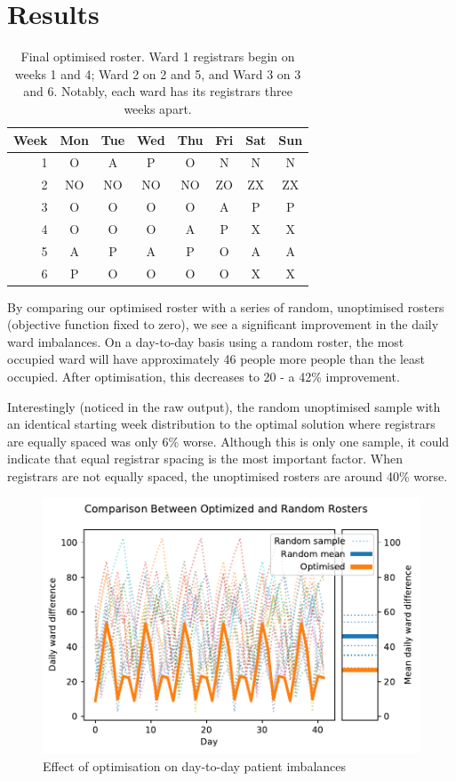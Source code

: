 \documentclass[a4paper]{article}
\begin{document}
\section{Results}
\begin{table}[H]
\centering
\caption{Final optimised roster. Ward 1 registrars begin on weeks 1 and 4; Ward 2 on 2 and 5, and Ward 3 on 3 and 6. Notably, each ward has its registrars three weeks apart.}
\label{tab:roster}
\begin{tabular}{r|ccccccc}
Week & Mon & Tue & Wed & Thu & Fri & Sat & Sun \\
\hline
 1	&O	&A	&P	&O	&N	&N	&N	\\
 2	&NO	&NO	&NO	&NO	&ZO	&ZX	&ZX	\\
 3	&O	&O	&O	&O	&A	&P	&P	\\
 4	&O	&O	&O	&A	&P	&X	&X	\\
 5	&A	&P	&A	&P	&O	&A	&A	\\
 6	&P	&O	&O	&O	&O	&X	&X	\\
\end{tabular}
\end{table}
\begin{multicols}{2}

By comparing our optimised roster with a series of random, unoptimised rosters (objective function fixed to zero), we see a significant improvement in the daily ward imbalances. On a day-to-day basis using a random roster, the most occupied ward will have approximately 46 people more people than the least occupied. After optimisation, this decreases to 20 - a 42\% improvement.

Interestingly (noticed in the raw output), the random unoptimised sample with an identical starting week distribution to the optimal solution where registrars are equally spaced was only 6\% worse. Although this is only one sample, it could indicate that equal registrar spacing is the most important factor. When registrars are not equally spaced, the unoptimised rosters are around 40\% worse.

\begin{figure}[H]
    \centering\includegraphics[width=\linewidth]{../results/comparison}
    \caption{Effect of optimisation on day-to-day patient imbalances}
    \label{fig:comparison}
\end{figure}

\end{multicols}
\end{document}
